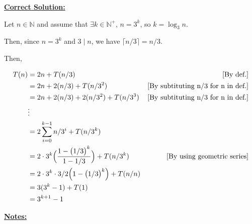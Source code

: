 \documentclass[12pt]{article}
\begin{document}
\begin{mdframed}
    \underline{\textbf{Correct Solution:}}

    \bigskip

    Let $n \in \mathbb{N}$ and assume that $\exists k \in \mathbb{N}^+$, $n = 3^k$,
    so $k = \log_3 n$.

    \bigskip

    Then, since $n = 3^k$ and $3 \mid n$, we have $\lceil n/3 \rceil = n/3$.

    \bigskip

    Then,

    \color{red}
    \begin{align}
        T(n) &= 2n + T(n/3) & [\text{By def.}]\\
        &= 2n + 2(n/3) +  T(n/3^2) & [\text{By subtituting n/3 for n in def.}]\\
        &= 2n + 2(n/3) + 2(n/3^2) + T(n/3^3) & [\text{By subtituting n/3 for n in def.}]\\
        &\vdots\\
        &= 2\sum\limits_{i=0}^{k-1} n/3^i + T(n/3^k)\\
        &= 2 \cdot 3^k \Bigl( \frac{1 - \bigl(1/3\bigr)^k}{1 - 1/3} \Bigr) + T(n/3^k) & [\text{By using geometric series}]\\
        &= 2 \cdot 3^k \cdot 3/2 \Bigl( 1 - \bigl(1/3\bigr)^k \Bigr) + T(n/n)\\
        &= 3(3^k - 1) + T(1)\\
        &= 3^{k+1} - 1
    \end{align}
    \color{black}

\end{mdframed}

\bigskip

\underline{\textbf{Notes:}}
\end{document}

